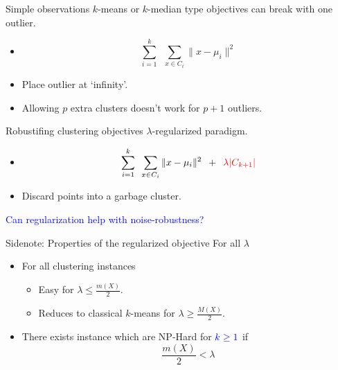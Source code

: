 \documentclass{beamer}
\begin{document}
\begin{frame}{Simple observations}
	$k$-means or $k$-median type objectives can \alert{break} with one outlier.
	\begin{itemize}
		\item $$\sum_{i =1}^k\enspace\sum_{x \in C_i} \|x - \mu_i\|^2$$		
		\vspace{10pt}\item Place outlier at `infinity'.
		\vspace{10pt}\item Allowing $p$ extra clusters doesn't work for $p+1$ outliers. 
	\end{itemize}
\end{frame}

\begin{frame}{Robustifing clustering objectives}
	$\lambda$-regularized paradigm.
	\begin{itemize}
		\vspace{5pt}\item $$\sum_{i =1}^k\enspace\sum_{x \in C_i} \|x - \mu_i\|^2 \enspace+\enspace \textcolor{red}{\lambda |C_{k+1}|}$$
		\vspace{20pt}\item Discard points into a garbage cluster.
	\end{itemize}
	
	\vspace{20pt}\textcolor{blue}{Can regularization help with noise-robustness?}
\end{frame}

\begin{frame}{Sidenote: Properties of the regularized objective}	
	For all $\lambda$
	\begin{itemize}
		\item For all clustering instances 
		\begin{itemize}
			\vspace{10pt}\item Easy for $\lambda \le \frac{m(X)}{2}$.
			\vspace{10pt}\item Reduces to classical $k$-means for $\lambda \ge \frac{M(X)}{2}$.			
		\end{itemize}
		\vspace{20pt}\item There exists instance which are NP-Hard for $\textcolor{blue}{k \ge 1}$ if $$\frac{m(X)}{2} < \lambda$$
	\end{itemize}
\end{frame}
\end{document}
